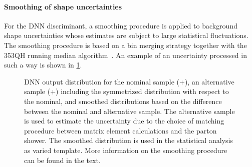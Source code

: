 \paragraph{Smoothing of shape uncertainties}
For the DNN discriminant, a smoothing procedure is applied to background shape uncertainties whose estimates are subject to large statistical fluctuations. 
The smoothing procedure is based on a bin merging strategy together with the 353QH running median algorithm~\cite{Friedman353QH}. 
An example of an uncertainty processed in such a way is shown in \cref{fig:dnn:smoothing}.
\begin{figure}[th]
    \centering
    {\caption{DNN output distribution for the nominal \ttbar sample (\Powheg+\PYTHIA[8]), an alternative sample (\aMCATNLO+\PYTHIA[8]) including the symmetrized distribution with respect to the nominal, and smoothed distributions based on the difference between the nominal and alternative sample. The alternative sample is used to estimate the uncertainty due to the choice of matching procedure between matrix element calculations and the parton shower. The smoothed distribution is used in the statistical analysis as varied template. More information on the smoothing procedure can be found in the text.
    \label{fig:dnn:smoothing} }}
\end{figure}

